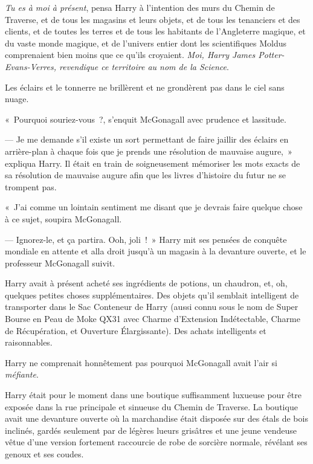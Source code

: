 \emph{Tu es à moi à présent}, pensa Harry à l'intention des murs du Chemin de Traverse, et de tous les magasins et leurs objets, et de tous les tenanciers et des clients, et de toutes les terres et de tous les habitants de l'Angleterre magique, et du vaste monde magique, et de l'univers entier dont les scientifiques Moldus comprenaient bien moins que ce qu'ils croyaient. \emph{Moi, Harry James Potter-Evans-Verres, revendique ce territoire au nom de la Science}.

Les éclairs et le tonnerre ne brillèrent et ne grondèrent pas dans le ciel sans nuage.

«~Pourquoi souriez-vous~?, s'enquit McGonagall avec prudence et lassitude.

--- Je me demande s'il existe un sort permettant de faire jaillir des éclairs en arrière-plan à chaque fois que je prends une résolution de mauvaise augure,~» expliqua Harry. Il était en train de soigneusement mémoriser les mots exacts de sa résolution de mauvaise augure afin que les livres d'histoire du futur ne se trompent pas.

«~J'ai comme un lointain sentiment me disant que je devrais faire quelque chose à ce sujet, soupira McGonagall.

--- Ignorez-le, et ça partira. Ooh, joli~!~» Harry mit ses pensées de conquête mondiale en attente et alla droit jusqu'à un magasin à la devanture ouverte, et le professeur McGonagall suivit.

\later

Harry avait à présent acheté ses ingrédients de potions, un chaudron, et, oh, quelques petites choses supplémentaires. Des objets qu'il semblait intelligent de transporter dans le Sac Conteneur de Harry (aussi connu sous le nom de Super Bourse en Peau de Moke QX31 avec Charme d'Extension Indétectable, Charme de Récupération, et Ouverture Élargissante). Des achats intelligents et raisonnables.

Harry ne comprenait honnêtement pas pourquoi McGonagall avait l'air si \emph{méfiante}.

Harry était pour le moment dans une boutique suffisamment luxueuse pour être exposée dans la rue principale et sinueuse du Chemin de Traverse. La boutique avait une devanture ouverte où la marchandise était disposée sur des étals de bois inclinés, gardés seulement par de légères lueurs grisâtres et une jeune vendeuse vêtue d’une version fortement raccourcie de robe de sorcière normale, révélant ses genoux et ses coudes.

